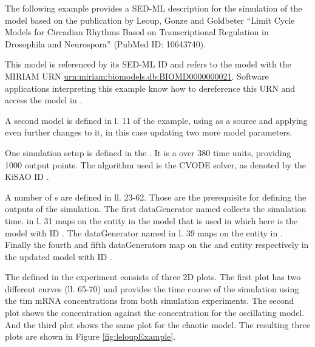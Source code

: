 The following example provides a SED-ML description for the simulation of the model based on the publication by Leoup, Gonze and Goldbeter ``Limit Cycle Models for Circadian Rhythms Based on Transcriptional Regulation in Drosophila and Neurospora'' (PubMed ID: 10643740).

This model is referenced by its SED-ML ID   and refers to the model with the MIRIAM URN \url{urn:miriam:biomodels.db:BIOMD0000000021}. 
Software applications interpreting this example know how to dereference this URN and access the model in \biom \citep{N+06}.

A second model is defined in l. 11 of the example, using  as a source and applying even further changes to it, in this case updating two more model parameters.

One simulation setup is defined in the . It is a  over 380 time units, providing 1000 output points. The algorithm used is the CVODE solver, as denoted by the KiSAO ID .

A number of s are defined in ll. 23-62. Those are the prerequisite for defining the outputs of the simulation. The first dataGenerator named  collects the simulation time.  in l. 31 maps on the  entity in the model that is used in  which here is the model with ID . The dataGenerator named  in l. 39 maps on the  entity in . Finally  the fourth and fifth dataGenerators map on the  and  entity respectively in the updated model with ID .

The  defined in the experiment consists of three 2D plots. The first plot has two different curves (ll. 65-70) and provides the time course of the simulation using the tim mRNA concentrations from both simulation experiments. The second plot shows the  concentration against the  concentration for the oscillating model. And the third plot shows the same plot for the chaotic model. The resulting three plots are shown in Figure \ref{fig:leloupExample}. 
%
%



